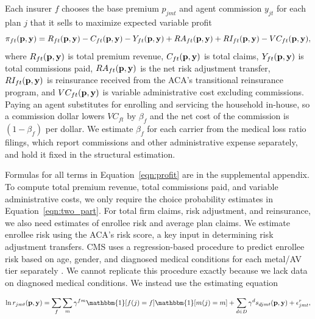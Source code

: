 \documentclass[12pt]{article}
\begin{document}
Each insurer $f$ chooses the base premium $p_{jmt}$ and agent commission $y_{jt}$ for each plan $j$ that it sells to maximize expected variable profit
\begin{equation}
\label{eqn:profit}
	\pi_{ft}({\bf p},{\bf y}) = R_{ft}({\bf p},{\bf y}) -  C_{ft}({\bf p},{\bf y})- Y_{ft}({\bf p},{\bf y}) + RA_{ft}({\bf p},{\bf y}) + RI_{ft}({\bf p},{\bf y}) - VC_{ft}({\bf p},{\bf y}),
\end{equation}
where $R_{ft}({\bf p},{\bf y})$ is total premium revenue, $C_{ft}({\bf p},{\bf y})$ is total claims,  $Y_{ft}({\bf p},{\bf y})$ is total commissions paid, $RA_{ft}({\bf p},{\bf y})$ is the net risk adjustment transfer, $RI_{ft}({\bf p},{\bf y})$ is reinsurance received from the ACA's transitional reinsurance program, and $VC_{ft}({\bf p},{\bf y})$ is variable administrative cost excluding commissions. Paying an agent substitutes for enrolling and servicing the household in-house, so a commission dollar lowers $VC_{ft}$ by $\beta_f$ and the net cost of the commission is $(1 - \beta_f)$ per dollar. We estimate $\beta_f$ for each carrier from the medical loss ratio filings, which report commissions and other administrative expense separately, and hold it fixed in the structural estimation. 

Formulas for all terms in Equation~\eqref{eqn:profit} are in the supplemental appendix.
To compute total premium revenue, total commissions paid, and variable administrative costs, we only require the choice probability estimates in Equation~\eqref{eqn:two_part}.  For total firm claims, risk adjustment, and reinsurance, we also need estimates of enrollee risk and average plan claims. We estimate enrollee risk using the ACA's risk score, a key input in determining risk adjustment transfers. CMS uses a regression-based procedure to predict enrollee risk based on age, gender, and diagnosed medical conditions for each metal/AV tier separately \citep{kautter2014}.  We cannot replicate this procedure exactly because we lack data on diagnosed medical conditions.  We instead use the estimating equation   

\begin{equation}
\label{eqn:risk_score_estimation}
	\ln r_{jmt}({\bf p},{\bf y}) = \sum_{f} \sum_{m} \gamma^{fm} \mathbbm{1}[f(j) = f] \mathbbm{1}[m(j) = m] + \sum_{d \in D} \gamma^d s_{djmt}({\bf p},{\bf y}) + \epsilon_{jmt}^r,
\end{equation}
\end{document}
